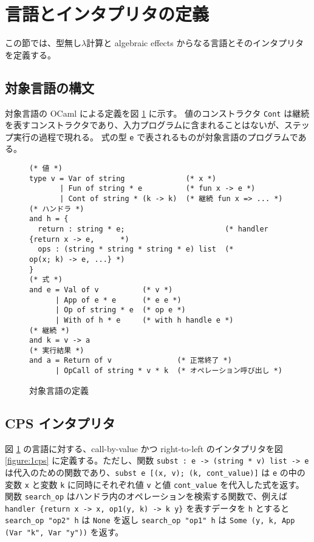 \section{言語とインタプリタの定義}
\label{section:definition}

この節では、型無し$\lambda$計算と algebraic effects からなる言語とそのインタプリタを定義する。

\subsection{対象言語の構文}
\label{subsection:syntax}

対象言語の OCaml による定義を図 \ref{figure:syntax} に示す。
値のコンストラクタ \texttt{Cont} は継続を表すコンストラクタであり、入力プログラムに含まれることはないが、ステップ実行の過程で現れる。
式の型 \texttt{e} で表されるものが対象言語のプログラムである。

\begin{figure}
\begin{verbatim}
(* 値 *)
type v = Var of string              (* x *)
       | Fun of string * e          (* fun x -> e *)
       | Cont of string * (k -> k)  (* 継続 fun x => ... *)
(* ハンドラ *)
and h = {
  return : string * e;                       (* handler {return x -> e,      *)
  ops : (string * string * string * e) list  (*          op(x; k) -> e, ...} *)
}
(* 式 *)
and e = Val of v          (* v *)
      | App of e * e      (* e e *)
      | Op of string * e  (* op e *)
      | With of h * e     (* with h handle e *)
(* 継続 *)
and k = v -> a
(* 実行結果 *)
and a = Return of v               (* 正常終了 *)
      | OpCall of string * v * k  (* オペレーション呼び出し *)
\end{verbatim}
\caption{対象言語の定義}
\label{figure:syntax}
\end{figure}

\subsection{CPS インタプリタ}

図 \ref{figure:syntax} の言語に対する、call-by-value かつ right-to-left のインタプリタを図 \ref{figure:1cps} に定義する。ただし、関数 \texttt{subst :\ e -> (string * v) list -> e} は代入のための関数であり、\texttt{subst e [(x, v); (k, cont\_value)]} は \texttt{e} の中の変数 \texttt{x} と変数 \texttt{k} に同時にそれぞれ値 \texttt{v} と値 \texttt{cont\_value} を代入した式を返す。関数 \texttt{search\_op} はハンドラ内のオペレーションを検索する関数で、例えば \texttt{handler \{return x -> x, op1(y, k) -> k y\}} を表すデータを \texttt{h} とすると \texttt{search\_op "op2" h} は \texttt{None} を返し \texttt{search\_op "op1" h} は \texttt{Some (y, k, App (Var "k", Var "y"))} を返す。

